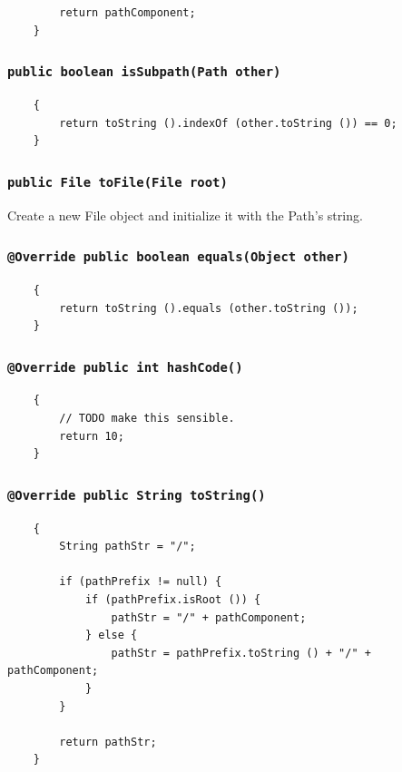 \documentclass [10pt, a4paper]{article}
\begin{document}
\begin {verbatim}
        return pathComponent;
    }
\end {verbatim}

\subsubsection{\texttt{public boolean isSubpath(Path other)}}
\begin {verbatim}
    {
        return toString ().indexOf (other.toString ()) == 0;
    }
\end {verbatim}

\subsubsection{\texttt{public File toFile(File root)}}
Create a new File object and initialize it with the Path's string.

\subsubsection{\texttt{@Override public boolean equals(Object other)}}
\begin {verbatim}
    {
        return toString ().equals (other.toString ());
    }
\end {verbatim}

\subsubsection{\texttt{@Override public int hashCode()}}
\begin {verbatim}
    {
        // TODO make this sensible.
        return 10;
    }
\end {verbatim}

\subsubsection{\texttt{@Override public String toString()}}
\begin {verbatim}
    {
        String pathStr = "/";

        if (pathPrefix != null) {
            if (pathPrefix.isRoot ()) {
                pathStr = "/" + pathComponent;
            } else {
                pathStr = pathPrefix.toString () + "/" + pathComponent;
            }
        }

        return pathStr;
    }
\end {verbatim}
\end{document}
